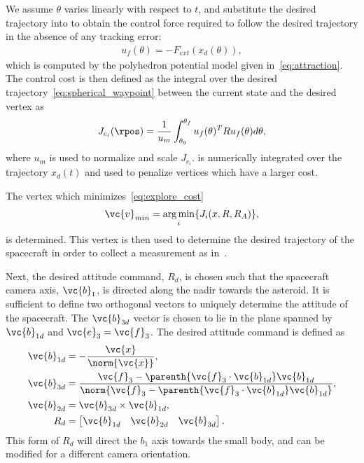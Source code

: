 \documentclass[smallextended]{svjour3}       %
\DeclareMathOperator*{\argmin}{arg\,min}
\begin{document}
We assume $\theta$ varies linearly with respect to $t$, and substitute the desired trajectory into  to obtain the control force required to follow the desired trajectory in the absence of any tracking error:
\begin{align}\label{eq:tracking_control_cost}
    u_f(\theta) = -F_{ext}(x_d(\theta)), 
\end{align}
which is computed by the polyhedron potential model given in~\cref{eq:attraction}.
The control cost is then defined as the integral over the desired trajectory~\cref{eq:spherical_waypoint} between the current state and the desired vertex as
\begin{align}\label{eq:control_cost}
    J_{c_i}(\rpos) = \frac{1}{u_m} \int_{\theta_0}^{\theta_f} u_f(\theta)^T R u_f(\theta) d\theta,
\end{align}
where \( u_m \) is used to normalize and scale \( J_{c_i} \).
 is numerically integrated over the trajectory \( x_d(t) \) and used to penalize vertices which have a larger cost.

The vertex which minimizes~\cref{eq:explore_cost} 
\begin{align*}
    \vc{v}_{min} = \argmin_{i} \{J_i(x, R, R_A)\},
\end{align*}
is determined.
This vertex is then used to determine the desired trajectory of the spacecraft in order to collect a measurement as in~.

Next, the desired attitude command, \( R_d\), is chosen such that the spacecraft camera axis, \( \vc{b}_1 \), is directed along the nadir towards the asteroid.
It is sufficient to define two orthogonal vectors to uniquely determine the attitude of the spacecraft.
The \( \vc{b}_{3d} \) vector is chosen to lie in the plane spanned by \(\vc{b}_{1d} \) and \( \vc{e}_3 = \vc{f}_3 \).
The desired attitude command is defined as
\begin{align}
    \vc{b}_{1d} &= - \frac{\vc{x}}{\norm{\vc{x}}} , \\
    \vc{b}_{3d} &= \frac{\vc{f}_3 - \parenth{\vc{f}_3 \cdot \vc{b}_{1d}} \vc{b}_{1d}}{\norm{\vc{f}_3 - \parenth{\vc{f}_3 \cdot \vc{b}_{1d}} \vc{b}_{1d}}}, \\
    \vc{b}_{2d} &= \vc{b}_{3d} \times \vc{b}_{1d} , \\
    R_d &= \begin{bmatrix} \vc{b}_{1d} & \vc{b}_{2d} & \vc{b}_{3d} \end{bmatrix} .
\end{align}
This form of \( R_d \) will direct the \( b_1 \) axis towards the small body, and can be modified for a different camera orientation.
\end{document}
